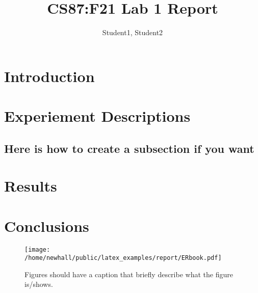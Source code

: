 \documentclass[11pt]{article}
\begin{document}
\title{CS87:F21 Lab 1 Report}

\author{Student1, Student2 }

\maketitle

\section {Introduction}   

\section {Experiement Descriptions}

\subsection{Here is how to create a subsection if you want}

\section {Results}

\section {Conclusions}


\begin{figure}[t]
\centerline{\texttt{[image: /home/newhall/public/latex\_examples/report/ERbook.pdf]}}
\caption{ {\label{bookER} Figures should have a caption that 
    briefly describe what the figure is/shows.  
}}
\end{figure}


\end{document}

